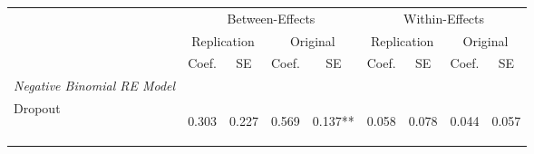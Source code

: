 \begin{center}
\begin{tabular}{lcccccccc}
\hline \noalign{\smallskip} & \multicolumn{4}{c}{Between-Effects} & \multicolumn{4}{c}{Within-Effects}\\
 & \multicolumn{2}{c}{Replication} & \multicolumn{2}{c}{Original} & \multicolumn{2}{c}{Replication} & \multicolumn{2}{c}{Original}\\
 & Coef. & SE & Coef. & SE & Coef. & SE & Coef. & SE\\
\noalign{\smallskip}\hline \noalign{\smallskip}\textit{Negative Binomial RE Model} & \begin{bf}\end{bf} & \begin{bf}\end{bf} & \begin{rm}\end{rm} & \begin{rm}\end{rm} & \begin{bf}\end{bf} & \begin{bf}\end{bf} & \begin{rm}\end{rm} & \begin{rm}\end{rm}\\
\hspace{1em} Dropout & \begin{bf}0.303\end{bf} & \begin{bf}0.227\end{bf} & \begin{rm}0.569\end{rm} & \begin{rm}0.137**\end{rm} & \begin{bf}0.058\end{bf} & \begin{bf}0.078\end{bf} & \begin{rm}0.044\end{rm} & \begin{rm}0.057\end{rm}\\

\end{tabular}
\end{center}
